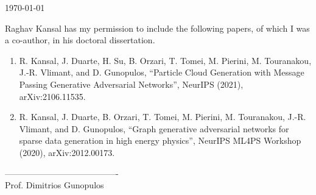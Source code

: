 \documentclass{article}
\begin{document}
\today

Raghav Kansal has my permission to include the following papers, of which
I was a co-author, in his doctoral dissertation.

\begin{enumerate}
    \item R. Kansal, J. Duarte, H. Su, B. Orzari, T. Tomei, M. Pierini, M. Touranakou, J.-R. Vlimant, and D. Gunopulos, “Particle Cloud Generation with Message Passing Generative Adversarial Networks”, NeurIPS (2021), arXiv:2106.11535.
    \item R. Kansal, J. Duarte, B. Orzari, T. Tomei, M. Pierini, M. Touranakou, J.-R. Vlimant, and D. Gunopulos, “Graph generative adversarial networks for sparse data generation in high energy physics”, NeurIPS ML4PS Workshop (2020), arXiv:2012.00173.
\end{enumerate}

\baselineskip
----------------------------------------\\
Prof. Dimitrios Gunopulos
\end{document}

